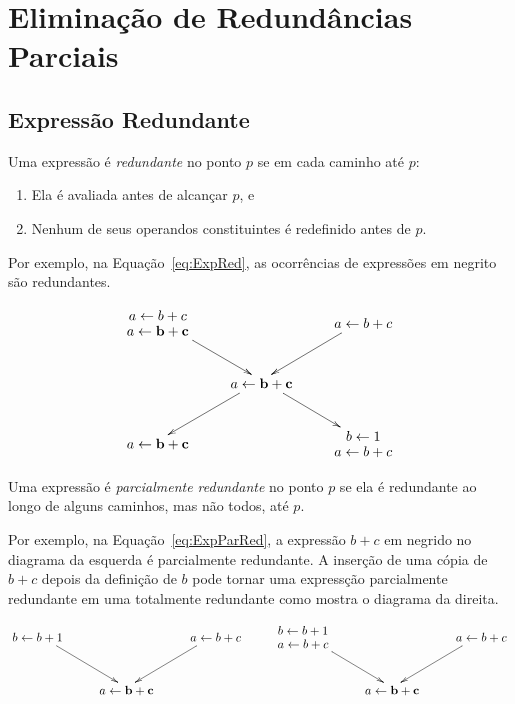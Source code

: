 \section{Elimina\c{c}\~ao de Redund\^ancias Parciais}


\subsection{Express\~ao Redundante}

Uma express\~ao \'e \emph{redundante} no ponto $p$ se em cada caminho at\'e $p$:
\begin{enumerate}
  \item Ela \'e avaliada antes de alcan\c{c}ar $p$, e
  \item Nenhum de seus operandos constituintes \'e redefinido antes de $p$.
\end{enumerate}

Por exemplo, na Equa\c{c}\~ao~\ref{eq:ExpRed}, as ocorr\^encias de express\~oes em negrito s\~ao redundantes.

\begin{equation}
\centering
  \xymatrix {
    \txt{$a \leftarrow b+c$\\$a \leftarrow \mathbf{b+c}$} \ar[dr] & & \txt{$a \leftarrow b+c$} \ar[dl] \\
                   & \txt{$a \leftarrow \mathbf{b+c}$} \ar[dl] \ar[dr] & \\
    \txt{$a \leftarrow \mathbf{b+c}$} & & \txt{$b \leftarrow 1$\\$a \leftarrow b+c$} 
  }
\label{eq:ExpRed}
\end{equation}

Uma express\~ao \'e \emph{parcialmente redundante} no ponto $p$ se ela \'e redundante ao longo de alguns caminhos, mas n\~ao todos, at\'e $p$.

Por exemplo, na Equa\c{c}\~ao~\ref{eq:ExpParRed}, a express\~ao $b+c$ em negrido no diagrama da esquerda \'e parcialmente redundante.
A inser\c{c}\~ao de uma c\'opia de $b+c$ depois da defini\c{c}\~ao de $b$ pode tornar uma express\c{c}\~ao parcialmente redundante em uma totalmente redundante como mostra o diagrama da direita.

\begin{equation}
\centering
  \xymatrix {
    \txt{$b \leftarrow b+1$} \ar[dr] & & \txt{$a \leftarrow b+c$} \ar[dl] & \txt{$b \leftarrow b+1$\\$a \leftarrow b+c$} \ar[dr] & & \txt{$a \leftarrow b+c$} \ar[dl]\\
     & \txt{$a \leftarrow \mathbf{b+c}$} & & & \txt{$a \leftarrow \mathbf{b+c}$} & \\
  }
\label{eq:ExpParRed}
\end{equation}


